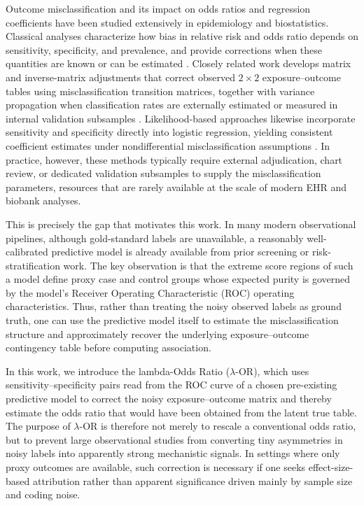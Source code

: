 \documentclass[pdflatex,sn-mathphys-num]{sn-jnl}%
\newcommand{\SPOR}{\textrm{$\lambda$-OR}}
\theoremstyle{thmstyleone}%
\theoremstyle{thmstyletwo}%
\theoremstyle{thmstylethree}%
\begin{document}
Outcome misclassification and its impact on odds ratios and regression coefficients have been studied extensively in epidemiology and biostatistics. Classical analyses characterize how bias in relative risk and odds ratio depends on sensitivity, specificity, and prevalence, and provide corrections when these quantities are known or can be estimated \cite{copeland1977misclassification,greenland1988sensitivity}. Closely related work develops matrix and inverse-matrix adjustments that correct observed $2\times 2$ exposure--outcome tables using misclassification transition matrices, together with variance propagation when classification rates are externally estimated or measured in internal validation subsamples \cite{greenland1988variance,morrissey1999matrix}. Likelihood-based approaches likewise incorporate sensitivity and specificity directly into logistic regression, yielding consistent coefficient estimates under nondifferential misclassification assumptions \cite{magder1997uncertainty,neuhaus1999bias}. In practice, however, these methods typically require external adjudication, chart review, or dedicated validation subsamples to supply the misclassification parameters, resources that are rarely available at the scale of modern EHR and biobank analyses.

This is precisely the gap that motivates this work. In many modern observational pipelines, although gold-standard labels are unavailable, a reasonably well-calibrated predictive model is already available from prior screening or risk-stratification work. The key observation is that the extreme score regions of such a model define proxy case and control groups whose expected purity is governed by the model's Receiver Operating Characteristic (ROC) operating characteristics. Thus, rather than treating the noisy observed labels as ground truth, one can use the predictive model itself to estimate the misclassification structure and approximately recover the underlying exposure--outcome contingency table before computing association.

In this work, we introduce the lambda-Odds Ratio ($\SPOR$), which uses sensitivity--specificity pairs read from the ROC curve of a chosen pre-existing predictive model to correct the noisy exposure--outcome matrix and thereby estimate the odds ratio that would have been obtained from the latent true table. The purpose of $\SPOR$ is therefore not merely to rescale a conventional odds ratio, but to prevent large observational studies from converting tiny asymmetries in noisy labels into apparently strong mechanistic signals. In settings where only proxy outcomes are available, such correction is necessary if one seeks effect-size-based attribution rather than apparent significance driven mainly by sample size and coding noise.
\end{document}
